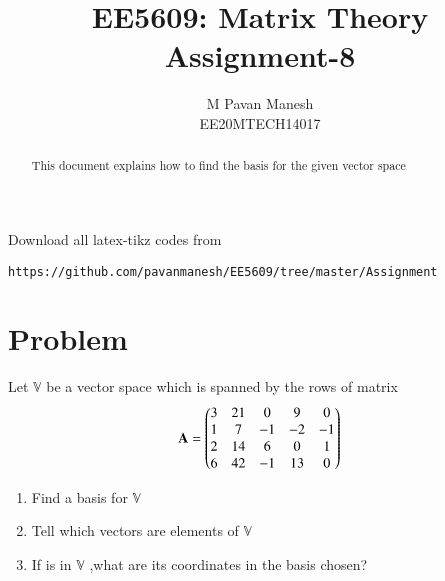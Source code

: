 \documentclass[journal,12pt,twocolumn]{IEEEtran}
\begin{document}
     \def\rightbox#1{\makebox[0in][r]{#1}}
     \def\centbox#1{\makebox[0in]{#1}}
     \def\topbox#1{\raisebox{-\baselineskip}[0in][0in]{#1}}
     \def\midbox#1{\raisebox{-0.5\baselineskip}[0in][0in]{#1}}
\vspace{3cm}
\title{EE5609: Matrix Theory\\
          Assignment-8\\}
\author{M Pavan Manesh\\
EE20MTECH14017 }
\maketitle
\newpage
\bigskip
\renewcommand{\thefigure}{\theenumi}
\renewcommand{\thetable}{\theenumi}
\begin{abstract}
This document explains how to find the basis for the given vector space
\end{abstract}
Download all latex-tikz codes from 
%
\begin{lstlisting}
https://github.com/pavanmanesh/EE5609/tree/master/Assignment
\end{lstlisting}
%
\section{Problem}
Let $\mathbb{V}$ be a vector space which is spanned by the rows of matrix
\begin{align}
    \mathbf{A} = \begin{pmatrix}3&21&0&9&0\\1&7&-1&-2&-1\\2&14&6&0&1\\6&42&-1&13&0\end{pmatrix}\label{eq:mat}
\end{align}
\begin{enumerate}[label=\alph*.]
\item Find a basis for $\mathbb{V}$
\item Tell which vectors  are elements of $\mathbb{V}$ 
\item If  is in $\mathbb{V}$ ,what are its coordinates in the basis chosen?
\end{enumerate}
\end{document}
